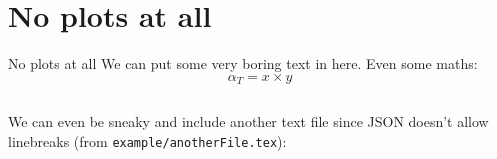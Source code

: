 \section{No plots at all}
\begin{frame}{No plots at all}
We can put some very boring text in here. Even some maths: 
 \begin{equation}
 \alpha_{T} = x \times y 
\end{equation}
\begin{columns}
\begin{column}{0.4\textwidth}
\begin{center}
\end{center}
\end{column}

\begin{column}{0.4\textwidth}
\begin{center}
\end{center}
\end{column}
\end{columns}
We can even be sneaky and include another text file since JSON doesn't allow linebreaks (from \texttt{example/anotherFile.tex}): 
 
\end{frame}
